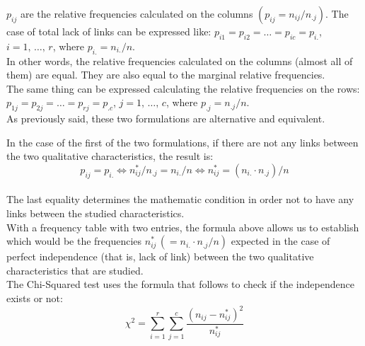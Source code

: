 \begin{frame}
  \vspace*{.25cm}
  $ p_{ij} $ are the relative frequencies calculated on the columns $ (p_{ij} = n_{ij}/n_{.j}) $. The case of total lack of links can be expressed like: $ p_{i1} = p_ {i2} = \dots = p_{ic} = p_{i.} $, $ i = 1, \, \dots, \, r $, where $ p_{i.} = n_{i.}/n $.\\
  In other words, the relative frequencies calculated on the columns (almost all of them) are equal. They are also equal to the marginal relative frequencies. \\
  \vspace*{.5cm}
  The same thing can be expressed calculating the relative frequencies on the rows: $ p_{1j} = p_{2j} = \dots = p_{rj} = p_{.c} $, $j = 1, \, \dots, \, c $, where $ p_{.j} = n_{.j}/n $.\\
  \vspace*{.5cm}
  As previously said, these two formulations are alternative and equivalent.
\end{frame}

\begin{frame}
  \vspace*{.25cm}
  In the case of the first of the two formulations, if there are not any links between the two qualitative characteristics, the result is:\\
  \vspace*{-.3cm}
  $$ p_{ij}=p_{i.} \Longleftrightarrow n_{ij}^*/n_{.j} = n_{i.}/n  \Longleftrightarrow n_{ij}^* = (n_{i.} \cdot n_{.j})/n $$\\
  \vspace*{.1cm}
  The last equality determines the mathematic condition in order not to have any links between the studied characteristics.\\
  With a frequency table with two entries, the formula above allows us to establish which would be the frequencies $ n_{ij}^* \, ( = n_{i.} \cdot n_{.j}/n) $ expected in the case of perfect independence (that is, lack of link) between the two qualitative characteristics that are studied.\\
  The Chi-Squared test uses the formula that follows to check if the independence exists or not:
  $$ \chi^2 = \sum_{i=1}^r \sum_{j=1}^c{\frac{(n_{ij}-n_{ij}^*)^2}{n_{ij}^*}} $$
\end{frame}

